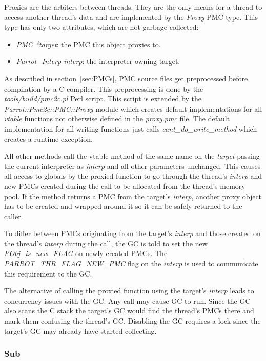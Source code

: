 \documentclass[bachelor,english]{hgbthesis}
\begin{document}
Proxies are the arbiters between threads. They are the only means for a thread to access another thread's data and are implemented by the \textit{Proxy} PMC type. This type has only two attributes, which are not garbage collected:
%
\begin{itemize}
\item \textit{PMC *target}: the PMC this object proxies to.
\item \textit{Parrot\_Interp interp}: the interpreter owning target.
\end{itemize}

As described in section~\ref{sec:PMCs}, PMC source files get preprocessed before compilation by a C compiler. This preprocessing is done by the \textit{tools/build/pmc2c.pl} Perl script. This script is extended by the \textit{Parrot::Pmc2c::PMC::Proxy} module which creates default implementations for all \textit{vtable} functions not otherwise defined in the \textit{proxy.pmc} file. The default implementation for all writing functions just calls \textit{cant\_do\_write\_method} which creates a runtime exception.

All other methods call the vtable method of the same name on the \textit{target} passing the current interpreter as \textit{interp} and all other parameters unchanged. This causes all access to globals by the proxied function to go through the thread's \textit{interp} and new PMCs created during the call to be allocated from the thread's memory pool. If the method returns a PMC from the target's \textit{interp}, another proxy object has to be created and wrapped around it so it can be safely returned to the caller.

To differ between PMCs originating from the target's \textit{interp} and those created on the thread's \textit{interp} during the call, the GC is told to set the new \textit{PObj\_is\_new\_FLAG} on newly created PMCs. The \textit{PARROT\_THR\_FLAG\_NEW\_PMC} flag on the \textit{interp} is used to communicate this requirement to the GC.

The alternative of calling the proxied function using the target's \textit{interp} leads to concurrency issues with the GC. Any call may cause GC to run. Since the GC also scans the C stack the target's GC would find the thread's PMCs there and mark them confusing the thread's GC. Disabling the GC requires a lock since the target's GC may already have started collecting.

\subsubsection{Sub}
\end{document}
